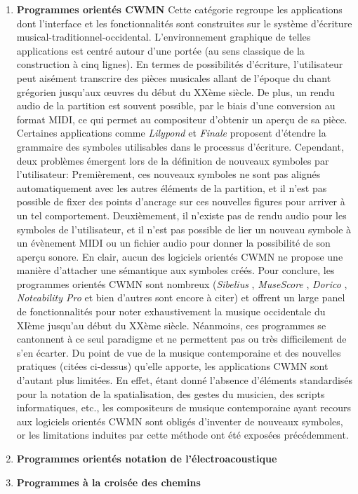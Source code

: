 \begin{enumerate}[label=(\arabic*)]
	\item \textbf{Programmes orientés CWMN} Cette catégorie regroupe les applications dont l'interface et les fonctionnalités sont construites sur le système d'écriture musical-traditionnel-occidental. L'environnement graphique de telles applications est centré autour d'une portée (au sens classique de la construction à cinq lignes). En termes de possibilités d'écriture, l'utilisateur peut aisément transcrire des pièces musicales allant de l'époque du chant grégorien jusqu'aux œuvres du début du XXème siècle. De plus, un rendu audio de la partition est souvent possible, par le biais d'une conversion au format MIDI, ce qui permet au compositeur d'obtenir un aperçu de sa pièce. Certaines applications comme \textit{Lilypond} \cite{lilypond2018} et \textit{Finale} \cite{finale2018} proposent d'étendre la grammaire des symboles utilisables dans le processus d'écriture. Cependant, deux problèmes émergent lors de la définition de nouveaux symboles par l'utilisateur: Premièrement, ces nouveaux symboles ne sont pas alignés automatiquement avec les autres éléments de la partition, et il n'est pas possible de fixer des points d'ancrage sur ces nouvelles figures pour arriver à un tel comportement. Deuxièmement, il n'existe pas de rendu audio pour les symboles de l'utilisateur, et il n'est pas possible de lier un nouveau symbole à un évènement MIDI ou un fichier audio pour donner la possibilité de son aperçu sonore. En clair, aucun des logiciels orientés CWMN ne propose une manière d'attacher une sémantique aux symboles créés.
Pour conclure, les programmes orientés CWMN sont nombreux (\textit{Sibelius} \cite{sibelius2018}, \textit{MuseScore} \cite{musescore2018}, \textit{Dorico} \cite{dorico2018}, \textit{Noteability Pro} \cite{noteAbility2018} et bien d'autres sont encore à citer) et offrent un large panel de fonctionnalités pour noter exhaustivement la musique occidentale du XIème jusqu'au début du XXème siècle.
Néanmoins, ces programmes se cantonnent à ce seul paradigme et ne permettent pas ou très difficilement de s'en écarter. Du point de vue de la musique contemporaine et des nouvelles pratiques (citées ci-dessus) qu'elle apporte, les applications CWMN sont d'autant plus limitées. En effet, étant donné l'absence d'éléments standardisés pour la notation de la spatialisation, des gestes du musicien, des scripts informatiques, etc., les compositeurs de musique contemporaine ayant recours aux logiciels orientés CWMN sont obligés d'inventer de nouveaux symboles, or les limitations induites par cette méthode ont été exposées précédemment.
  
	\item \textbf{Programmes orientés notation de l'électroacoustique} 	
	\item \textbf{Programmes à la croisée des chemins}
\end{enumerate} 

